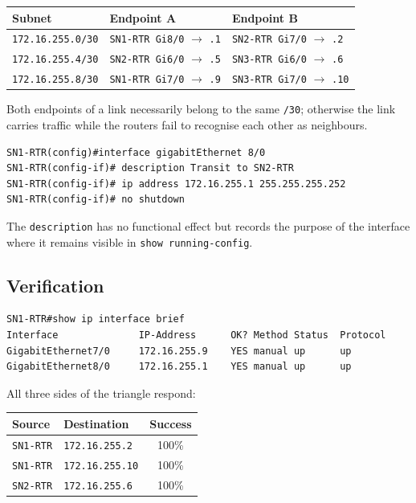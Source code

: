\documentclass[12pt,a4paper]{article}
\begin{document}
\begin{table}[H]
\centering
\begin{tabular}{@{} l l l @{}}
\toprule
\textbf{Subnet} & \textbf{Endpoint A} & \textbf{Endpoint B} \\
\midrule
\texttt{172.16.255.0/30} & \texttt{SN1-RTR Gi8/0} $\to$ \texttt{.1}
                         & \texttt{SN2-RTR Gi7/0} $\to$ \texttt{.2} \\
\texttt{172.16.255.4/30} & \texttt{SN2-RTR Gi6/0} $\to$ \texttt{.5}
                         & \texttt{SN3-RTR Gi6/0} $\to$ \texttt{.6} \\
\texttt{172.16.255.8/30} & \texttt{SN1-RTR Gi7/0} $\to$ \texttt{.9}
                         & \texttt{SN3-RTR Gi7/0} $\to$ \texttt{.10} \\
\bottomrule
\end{tabular}
\end{table}

Both endpoints of a link necessarily belong to the same \texttt{/30}; otherwise
the link carries traffic while the routers fail to recognise each other as
neighbours.

\begin{lstlisting}
SN1-RTR(config)#interface gigabitEthernet 8/0
SN1-RTR(config-if)# description Transit to SN2-RTR
SN1-RTR(config-if)# ip address 172.16.255.1 255.255.255.252
SN1-RTR(config-if)# no shutdown
\end{lstlisting}

The \texttt{description} has no functional effect but records the purpose of the
interface where it remains visible in \texttt{show running-config}.

\subsection{Verification}

\begin{lstlisting}
SN1-RTR#show ip interface brief
Interface              IP-Address      OK? Method Status  Protocol
GigabitEthernet7/0     172.16.255.9    YES manual up      up
GigabitEthernet8/0     172.16.255.1    YES manual up      up
\end{lstlisting}

All three sides of the triangle respond:

\begin{center}
\begin{tabular}{@{} l l c @{}}
\toprule
\textbf{Source} & \textbf{Destination} & \textbf{Success} \\
\midrule
\texttt{SN1-RTR} & \texttt{172.16.255.2}  & 100\% \\
\texttt{SN1-RTR} & \texttt{172.16.255.10} & 100\% \\
\texttt{SN2-RTR} & \texttt{172.16.255.6}  & 100\% \\
\bottomrule
\end{tabular}
\end{center}
\end{document}
